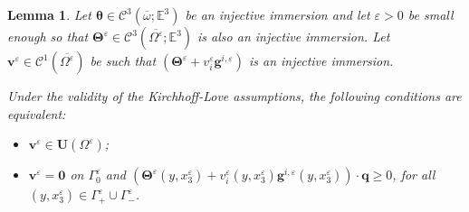 \documentclass[10pt,a4paper]{amsart}
\newtheorem{lemma}{Lemma}
\begin{document}
\begin{lemma}
	\label{Signorini}
	Let $\bm{\theta}\in\mathcal{C}^3(\overline{\omega};\mathbb{E}^3)$ be an injective immersion and let $\varepsilon>0$ be small enough so that $\bm{\Theta}^\varepsilon\in\mathcal{C}^3(\overline{\Omega^\varepsilon};\mathbb{E}^3)$ is also an injective immersion.
	Let $\bm{v}^\varepsilon \in \bm{\mathcal{C}}^1(\overline{\Omega^\varepsilon})$ be such that $(\bm{\Theta}^\varepsilon+v_i^\varepsilon\bm{g}^{i,\varepsilon})$ is an injective immersion.
	
	Under the validity of the Kirchhoff-Love assumptions, the following conditions are equivalent:
	\begin{itemize}
		\item[(i)] $\bm{v}^\varepsilon \in \bm{U}(\Omega^\varepsilon)$;
		\item[(ii)] $\bm{v}^\varepsilon=\bm{0}$ on $\Gamma_0^\varepsilon$ and $(\bm{\Theta}^\varepsilon(y,x_3^\varepsilon) +v_i^\varepsilon(y,x_3^\varepsilon)\bm{g}^{i,\varepsilon}(y,x_3^\varepsilon)) \cdot\bm{q}\ge 0$, for all $(y,x_3^\varepsilon) \in \Gamma^\varepsilon_+ \cup \Gamma^\varepsilon_{-}$.
	\end{itemize}
\end{lemma}
\end{document}
